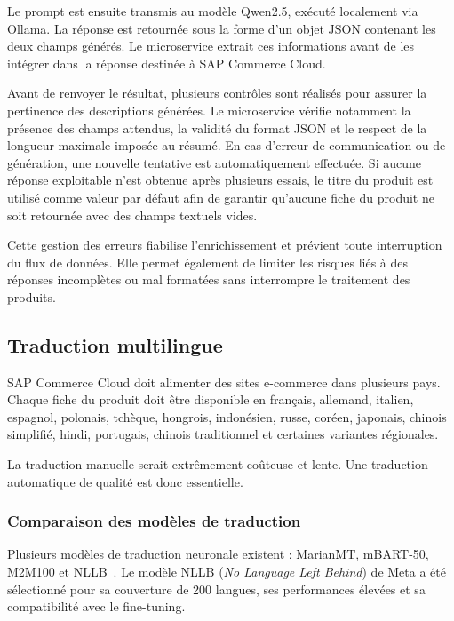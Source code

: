 Le prompt est ensuite transmis au modèle Qwen2.5, exécuté localement via Ollama. La réponse est retournée sous la forme d'un objet JSON contenant les deux champs générés. Le microservice extrait ces informations avant de les intégrer dans la réponse destinée à SAP Commerce Cloud.

Avant de renvoyer le résultat, plusieurs contrôles sont réalisés pour assurer la pertinence des descriptions générées. Le microservice vérifie notamment la présence des champs attendus, la validité du format JSON et le respect de la longueur maximale imposée au résumé.
\newpage
En cas d'erreur de communication ou de génération, une nouvelle tentative est automatiquement effectuée. Si aucune réponse exploitable n'est obtenue après plusieurs essais, le titre du produit est utilisé comme valeur par défaut afin de garantir qu'aucune fiche du produit ne soit retournée avec des champs textuels vides.

Cette gestion des erreurs fiabilise l'enrichissement et prévient toute interruption du flux de données. Elle permet également de limiter les risques liés à des réponses incomplètes ou mal formatées sans interrompre le traitement des produits.

\subsection{Traduction multilingue}

SAP Commerce Cloud doit alimenter des sites e-commerce dans plusieurs pays. Chaque fiche du produit doit être disponible en français, allemand, italien, espagnol, polonais, tchèque, hongrois, indonésien, russe, coréen, japonais, chinois simplifié, hindi, portugais, chinois traditionnel et certaines variantes régionales.

La traduction manuelle serait extrêmement coûteuse et lente. Une traduction automatique de qualité est donc essentielle.

\subsubsection{Comparaison des modèles de traduction}

Plusieurs modèles de traduction neuronale existent : MarianMT, mBART-50, M2M100 et NLLB~. Le modèle NLLB (\textit{No Language Left Behind}) de Meta a été sélectionné pour sa couverture de 200 langues, ses performances élevées et sa compatibilité avec le fine-tuning.


